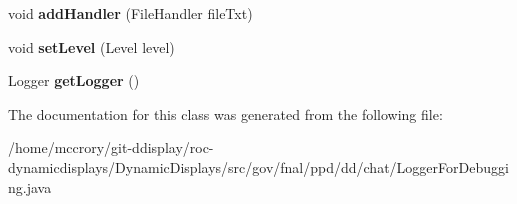 \begin{DoxyCompactItemize}
\item 
\hypertarget{classgov_1_1fnal_1_1ppd_1_1dd_1_1chat_1_1LoggerForDebugging_a85327b875e4232191aa71782daee5fb3}{void {\bfseries add\-Handler} (File\-Handler file\-Txt)}\label{classgov_1_1fnal_1_1ppd_1_1dd_1_1chat_1_1LoggerForDebugging_a85327b875e4232191aa71782daee5fb3}

\item 
\hypertarget{classgov_1_1fnal_1_1ppd_1_1dd_1_1chat_1_1LoggerForDebugging_afa1df09f05cefed4e672ec474f23ed35}{void {\bfseries set\-Level} (Level level)}\label{classgov_1_1fnal_1_1ppd_1_1dd_1_1chat_1_1LoggerForDebugging_afa1df09f05cefed4e672ec474f23ed35}

\item 
\hypertarget{classgov_1_1fnal_1_1ppd_1_1dd_1_1chat_1_1LoggerForDebugging_a2d1f413fb8fda0b558935ee6734cf1c5}{Logger {\bfseries get\-Logger} ()}\label{classgov_1_1fnal_1_1ppd_1_1dd_1_1chat_1_1LoggerForDebugging_a2d1f413fb8fda0b558935ee6734cf1c5}

\end{DoxyCompactItemize}


The documentation for this class was generated from the following file\-:\begin{DoxyCompactItemize}
\item 
/home/mccrory/git-\/ddisplay/roc-\/dynamicdisplays/\-Dynamic\-Displays/src/gov/fnal/ppd/dd/chat/Logger\-For\-Debugging.\-java\end{DoxyCompactItemize}
